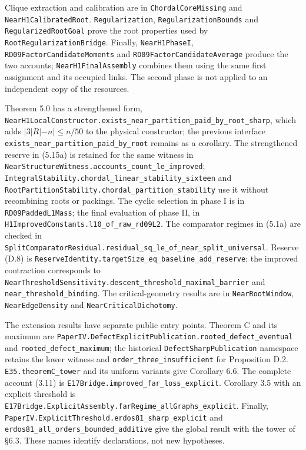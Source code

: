 \documentclass[english,11pt,a4paper]{article}
\begin{document}
Clique extraction and calibration are in \nolinkurl{ChordalCoreMissing} and
\nolinkurl{NearH1CalibratedRoot}. \nolinkurl{Regularization},
\nolinkurl{RegularizationBounds} and \nolinkurl{RegularizedRootGoal} prove the
root properties used by \nolinkurl{RootRegularizationBridge}. Finally,
\nolinkurl{NearH1PhaseI}, \nolinkurl{RD09FactorCandidateMoments} and
\nolinkurl{RD09FactorCandidateAverage} produce the two accounts;
\nolinkurl{NearH1FinalAssembly} combines them using the same first
assignment and its occupied links. The second phase is not applied to an
independent copy of the resources.

Theorem 5.0 has a strengthened form,
\nolinkurl{NearH1LocalConstructor.exists_near_partition_paid_by_root_sharp},
which adds \(|3|R|-n|\le n/50\) to the physical constructor; the
previous interface \nolinkurl{exists_near_partition_paid_by_root}
remains as a corollary. The strengthened reserve in (5.15a) is retained
for the same witness in
\nolinkurl{NearStructureWitness.accounts_count_le_improved};
\nolinkurl{IntegralStability.chordal_linear_stability_sixteen} and
\nolinkurl{RootPartitionStability.chordal_partition_stability} use it
without recombining roots or packings. The cyclic selection in phase I
is in \nolinkurl{RD09PaddedL1Mass}; the final evaluation of phase II, in
\nolinkurl{H1ImprovedConstants.l10_of_raw_rd09L2}. The comparator
regimes in (5.1a) are checked in
\nolinkurl{SplitComparatorResidual.residual_sq_le_of_near_split_universal}.
Reserve (D.8) is
\nolinkurl{ReserveIdentity.targetSize_eq_baseline_add_reserve}; the
improved contraction corresponds to
\nolinkurl{NearThresholdSensitivity.descent_threshold_maximal_barrier}
and \nolinkurl{near_threshold_binding}. The critical-geometry results are
in \nolinkurl{NearRootWindow}, \nolinkurl{NearEdgeDensity} and
\nolinkurl{NearCriticalDichotomy}.

The extension results have separate public entry points. Theorem C and
its maximum are
\nolinkurl{PaperIV.DefectExplicitPublication.rooted_defect_eventual} and
\nolinkurl{rooted_defect_maximum}; the historical
\nolinkurl{DefectSharpPublication} namespace retains the lower witness and
\nolinkurl{order_three_insufficient} for Proposition D.2.
\nolinkurl{E35.theoremC_tower} and its uniform variants give Corollary
6.6. The complete account (3.11) is
\nolinkurl{E17Bridge.improved_far_loss_explicit}. Corollary 3.5 with an
explicit threshold is
\nolinkurl{E17Bridge.ExplicitAssembly.farRegime_allGraphs_explicit}.
Finally, \nolinkurl{PaperIV.ExplicitThreshold.erdos81_sharp_explicit} and
\nolinkurl{erdos81_all_orders_bounded_additive} give the global result
with the tower of §6.3. These names identify declarations, not new
hypotheses.
\end{document}
